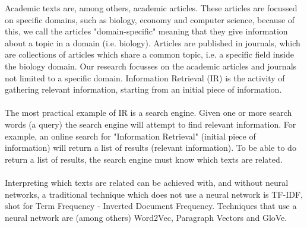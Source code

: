 \documentclass[../../Thesis.tex]{subfiles}
\begin{document}
Academic texts are, among others, academic articles. These articles are focussed on specific domains, such as biology, economy and computer science, because of this, we call the articles "domain-specific" meaning that they give information about a topic in a domain (i.e. biology). Articles are published in journals, which are collections of articles which share a common topic, i.e. a specific field inside the biology domain. Our research focusses on the academic articles and journals not limited to a specific domain.
Information Retrieval (IR) is the activity of gathering relevant information, starting from an initial piece of information. 
\\\\The most practical example of IR is a search engine. Given one or more search words (a query) the search engine will attempt to find relevant information. For example, an online search for "Information Retrieval" (initial piece of information) will return a list of results (relevant information). To be able to do return a list of results, the search engine must know which texts are related. \\\\Interpreting which texts are related can be achieved with, and without neural networks, a traditional technique which does not use a neural network is TF-IDF, shot for Term Frequency - Inverted Document Frequency. Techniques that use a neural network are (among others) Word2Vec, Paragraph Vectors and GloVe.
\end{document}
